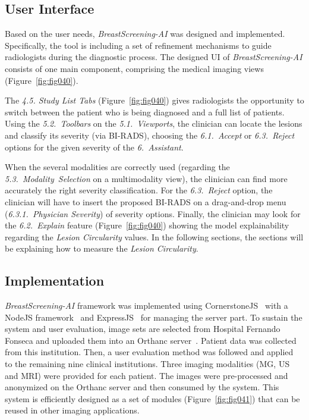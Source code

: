 \subsection{User Interface}
\label{sec:app002004002}

Based on the user needs, {\it BreastScreening-AI} was designed and implemented.
Specifically, the tool is including a set of refinement mechanisms to guide radiologists during the diagnostic process.
The designed \ac{UI} of {\it BreastScreening-AI} consists of one main component, comprising the medical imaging views (Figure~\ref{fig:fig040}).

The {\it 4.5. Study List Tabs} (Figure~\ref{fig:fig040}) gives radiologists the opportunity to switch between the patient who is being diagnosed and a full list of patients.
Using the {\it 5.2.~Toolbars} on the {\it 5.1.~Viewports}, the clinician can locate the lesions and classify its severity (via \ac{BI-RADS}), choosing the {\it 6.1.~Accept} or {\it 6.3.~Reject} options for the given severity of the {\it 6.~Assistant}.

When the several modalities are correctly used (regarding the {\it 5.3.~Modality~Selection} on a multimodality view), the clinician can find more accurately the right severity classification.
For the {\it 6.3.~Reject} option, the clinician will have to insert the proposed \ac{BI-RADS} on a drag-and-drop menu ({\it 6.3.1.~Physician Severity}) of severity options.
Finally, the clinician may look for the {\it 6.2.~Explain} feature (Figure~\ref{fig:fig040}) showing the model explainability regarding the {\it Lesion Circularity} values.
In the following sections, the sections will be explaining how to measure the {\it Lesion Circularity}.

\subsection{Implementation}
\label{sec:app002004003}

{\it BreastScreening-AI} framework was implemented using CornerstoneJS\footnotemark[36]~\cite{urban2017lesiontracker} with a NodeJS framework\footnotemark[37]~\cite{farrell2016nodejs, drnasin2017javascript} and ExpressJS\footnotemark[38]~\cite{gustin2017empowerment} for managing the server part.
To sustain the system and user evaluation, image sets are selected from Hospital Fernando Fonseca and uploaded them into an Orthanc server~\cite{Jodogne2018}.
Patient data was collected from this institution.
Then, a user evaluation method was followed and applied~\cite{https://doi.org/10.13140/rg.2.2.16566.14403/1} to the remaining nine clinical institutions.
Three imaging modalities (\ac{MG}, \ac{US} and \ac{MRI}) were provided for each patient.
The images were pre-processed and anonymized on the Orthanc server and then consumed by the system.
This system is efficiently designed as a set of modules (Figure~\ref{fig:fig041}) that can be reused in other imaging applications.

